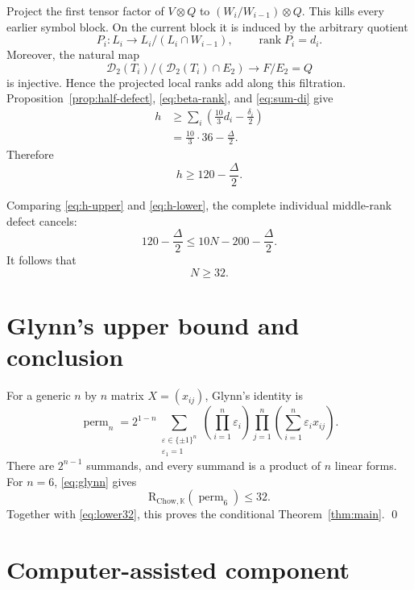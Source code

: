 \documentclass[11pt]{amsart}
\newcommand{\K}{\mathbb{K}}
\newcommand{\rank}{\operatorname{rank}}
\newcommand{\perm}{\operatorname{perm}}
\newcommand{\CR}{\mathrm{R}_{\mathrm{Chow},\K}}
\newcommand{\cD}{\mathcal{D}}
\theoremstyle{definition}
\begin{document}
Project the first tensor factor of \(V\otimes Q\) to
\((W_i/W_{i-1})\otimes Q\).  This kills every earlier symbol block.  On
the current block it is induced by the arbitrary quotient
\[
 P_i:L_i\longrightarrow L_i/(L_i\cap W_{i-1}),
 \qquad \rank P_i=d_i.
\]
Moreover, the natural map
\[
 \cD_2(T_i)/(\cD_2(T_i)\cap E_2)\longrightarrow F/E_2=Q
\]
is injective.  Hence the projected local ranks add along this filtration.
Proposition~\ref{prop:half-defect}, \eqref{eq:beta-rank}, and
\eqref{eq:sum-di} give
\begin{align}
 h
 &\geq\sum_i\left(\frac{10}{3}d_i-\frac{\delta_i}{2}\right)\\
 &=\frac{10}{3}\cdot36-\frac{\Delta}{2}.
\end{align}
Therefore
\begin{equation}\label{eq:h-lower}
 \boxed{h\geq120-\frac{\Delta}{2}.}
\end{equation}

Comparing \eqref{eq:h-upper} and \eqref{eq:h-lower}, the complete
individual middle-rank defect cancels:
\[
 120-\frac{\Delta}{2}
 \leq10N-200-\frac{\Delta}{2}.
\]
It follows that
\begin{equation}\label{eq:lower32}
 N\geq32.
\end{equation}

\section{Glynn's upper bound and conclusion}

For a generic \(n\) by \(n\) matrix \(X=(x_{ij})\), Glynn's identity
\cite{Glynn2010} is
\begin{equation}\label{eq:glynn}
 \perm_n
 =2^{1-n}
 \sum_{\substack{\varepsilon\in\{\pm1\}^n\\\varepsilon_1=1}}
 \left(\prod_{i=1}^{n}\varepsilon_i\right)
 \prod_{j=1}^{n}\left(\sum_{i=1}^{n}\varepsilon_i x_{ij}\right).
\end{equation}
There are \(2^{n-1}\) summands, and every summand is a product of \(n\)
linear forms.  For \(n=6\), \eqref{eq:glynn} gives
\[
 \CR(\perm_6)\leq32.
\]
Together with \eqref{eq:lower32}, this proves the conditional
Theorem~\ref{thm:main}. \qed

\section{Computer-assisted component}
\end{document}
